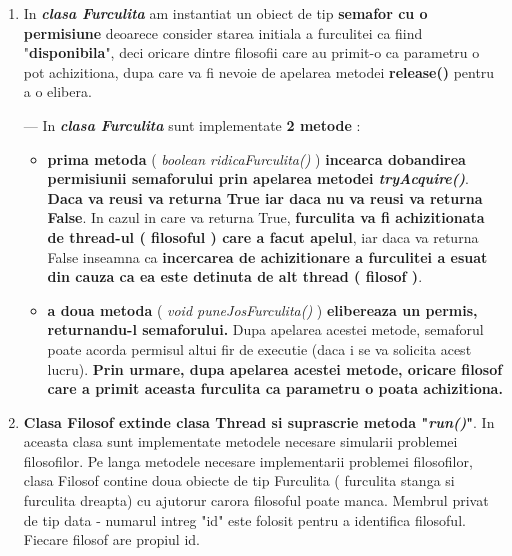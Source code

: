 \documentclass[14pt]{article}
\begin{document}
\begin{enumerate}
\item In \textbf{\textit{clasa Furculita}} am instantiat un obiect de tip \textbf{semafor cu o permisiune} deoarece consider starea initiala a furculitei ca fiind "\textbf{disponibila}", deci oricare dintre filosofii care au primit-o ca parametru o pot achizitiona, dupa care va fi nevoie de apelarea metodei \textbf{release() }pentru a o elibera.



--- In \textbf{\textit{clasa Furculita}} sunt implementate \textbf{2 metode} : 

\begin{itemize}
\item \textbf{prima metoda} ( \textit{boolean ridicaFurculita()} ) \textbf{incearca dobandirea permisiunii semaforului prin apelarea metodei \textit{tryAcquire()}}. \textbf{Daca va reusi va returna True iar daca nu va reusi va returna False}. In cazul in care va returna True, \textbf{furculita va fi achizitionata de thread-ul ( filosoful ) care a facut apelul}, iar daca va returna False inseamna ca \textbf{incercarea de achizitionare a furculitei a esuat din cauza ca ea este detinuta de alt thread ( filosof )}.
\end{itemize}


\begin{itemize}
\item \textbf{a doua metoda} (\textit{ void puneJosFurculita()} )\textbf{ elibereaza un permis, returnandu-l semaforului. }Dupa apelarea acestei  metode, semaforul poate acorda permisul altui fir de executie (daca i se va solicita acest lucru). \textbf{Prin urmare, dupa apelarea acestei metode, oricare filosof  care a primit aceasta furculita ca parametru o poata achizitiona.}
\end{itemize}

 \vspace{3 mm}

\item \textbf{Clasa Filosof extinde clasa Thread si suprascrie metoda "\textit{run()}"}. In aceasta clasa sunt implementate metodele necesare simularii problemei filosofilor. Pe langa metodele necesare implementarii problemei filosofilor, clasa Filosof contine doua obiecte de tip Furculita ( furculita stanga si furculita dreapta) cu ajutorur carora filosoful poate manca. Membrul privat de tip data - numarul intreg "id" este folosit pentru a identifica filosoful. Fiecare filosof are propiul id. 


\end{enumerate}
\end{document}
